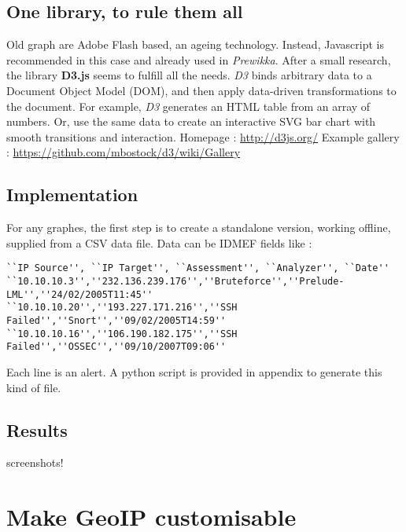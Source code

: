 \documentclass{koala-en}
\begin{document}
\subsection{One library, to rule them all}
Old graph are Adobe Flash based, an ageing technology.
\newline
\newline
Instead, Javascript is recommended in this case and already used in \emph{Prewikka}. After a small research, the library \textbf{D3.js} seems to fulfill all the needs.
\newline
\newline
\emph{D3} binds arbitrary data to a Document Object Model (DOM), and then apply data-driven transformations to the document. For example, \emph{D3} generates an HTML table from an array of numbers. Or, use the same data to create an interactive SVG bar chart with smooth transitions and interaction.
\newline
\newline
Homepage : \url{http://d3js.org/}
\newline
Example gallery : \url{https://github.com/mbostock/d3/wiki/Gallery}

\subsection{Implementation}
For any graphes, the first step is to create a standalone version, working offline, supplied from a CSV data file. Data can be IDMEF fields like :
\begin{lstlisting}
``IP Source'', ``IP Target'', ``Assessment'', ``Analyzer'', ``Date''
``10.10.10.3'',''232.136.239.176'',''Bruteforce'',''Prelude-LML'',''24/02/2005T11:45''
``10.10.10.20'',''193.227.171.216'',''SSH Failed'',''Snort'',''09/02/2005T14:59''
``10.10.10.16'',''106.190.182.175'',''SSH Failed'',''OSSEC'',''09/10/2007T09:06''
\end{lstlisting}

Each line is an alert. A python script is provided in appendix to generate this kind of file.
\newline
\newline


\subsection{Results}
screenshots!

\section{Make GeoIP customisable}
\end{document}
